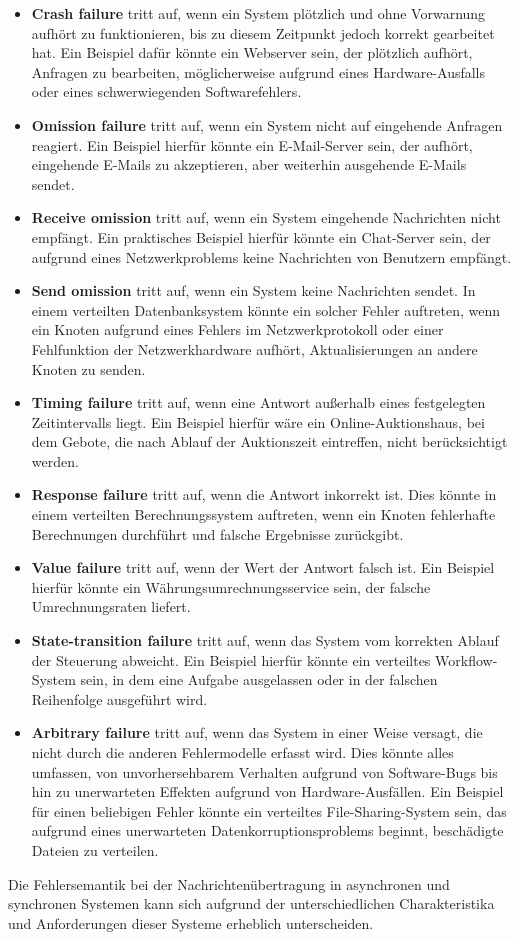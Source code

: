 \begin{itemize}
\item \textbf{Crash failure} tritt auf, wenn ein System plötzlich und ohne Vorwarnung aufhört zu funktionieren, bis zu diesem Zeitpunkt jedoch korrekt gearbeitet hat. Ein Beispiel dafür könnte ein Webserver sein, der plötzlich aufhört, Anfragen zu bearbeiten, möglicherweise aufgrund eines Hardware-Ausfalls oder eines schwerwiegenden Softwarefehlers.
\item \textbf{Omission failure} tritt auf, wenn ein System nicht auf eingehende Anfragen reagiert. Ein Beispiel hierfür könnte ein E-Mail-Server sein, der aufhört, eingehende E-Mails zu akzeptieren, aber weiterhin ausgehende E-Mails sendet.
\item  \textbf{Receive omission} tritt auf, wenn ein System eingehende Nachrichten nicht empfängt. Ein praktisches Beispiel hierfür könnte ein Chat-Server sein, der aufgrund eines Netzwerkproblems keine Nachrichten von Benutzern empfängt.
\item \textbf{Send omission} tritt auf, wenn ein System keine Nachrichten sendet. In einem verteilten Datenbanksystem könnte ein solcher Fehler auftreten, wenn ein Knoten aufgrund eines Fehlers im Netzwerkprotokoll oder einer Fehlfunktion der Netzwerkhardware aufhört, Aktualisierungen an andere Knoten zu senden.
\item \textbf{Timing failure}  tritt auf, wenn eine Antwort außerhalb eines festgelegten Zeitintervalls liegt. Ein Beispiel hierfür wäre ein Online-Auktionshaus, bei dem Gebote, die nach Ablauf der Auktionszeit eintreffen, nicht berücksichtigt werden.
\item \textbf{Response failure} tritt auf, wenn die Antwort inkorrekt ist. Dies könnte in einem verteilten Berechnungssystem auftreten, wenn ein Knoten fehlerhafte Berechnungen durchführt und falsche Ergebnisse zurückgibt.
\item \textbf{Value failure}  tritt auf, wenn der Wert der Antwort falsch ist. Ein Beispiel hierfür könnte ein Währungsumrechnungsservice sein, der falsche Umrechnungsraten liefert.
\item \textbf{State-transition failure} tritt auf, wenn das System vom korrekten Ablauf der Steuerung abweicht. Ein Beispiel hierfür könnte ein verteiltes Workflow-System sein, in dem eine Aufgabe ausgelassen oder in der falschen Reihenfolge ausgeführt wird.
\item \textbf{Arbitrary failure} tritt auf, wenn das System in einer Weise versagt, die nicht durch die anderen Fehlermodelle erfasst wird. Dies könnte alles umfassen, von unvorhersehbarem Verhalten aufgrund von Software-Bugs bis hin zu unerwarteten Effekten aufgrund von Hardware-Ausfällen. Ein Beispiel für einen beliebigen Fehler könnte ein verteiltes File-Sharing-System sein, das aufgrund eines unerwarteten Datenkorruptionsproblems beginnt, beschädigte Dateien zu verteilen.
\end{itemize}
Die Fehlersemantik bei der Nachrichtenübertragung in asynchronen und synchronen Systemen kann sich aufgrund der unterschiedlichen Charakteristika und Anforderungen dieser Systeme erheblich unterscheiden.

